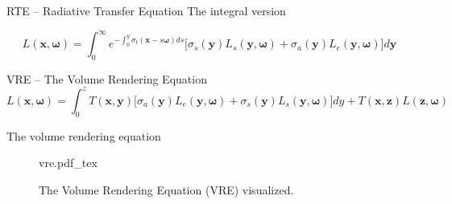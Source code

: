 \documentclass[
  english,            %
  aspectratio=169,    %
]{tumbeamer}
\newcommand\bx[0]{\textbf{x}}
\newcommand\by[0]{\textbf{y}}
\newcommand\bomega[0]{\boldsymbol{\omega}}
\newcommand{\incfig}[1]{%
    \def\svgwidth{\columnwidth}
    {#1.pdf_tex}
}
\begin{document}
\begin{frame}{RTE -- Radiative Transfer Equation}
    {The integral version}
    \vfill
    \begin{figure}[ht]
        \centering
        \scalebox{.7}{
            
        }
    \end{figure}
    \vfill
    \begin{equation}
        L(\bx, \bomega) = \int_0^\infty 
        e^{-\int_0^y{\sigma_t(\bx-s\bomega)}ds}
        \Big[
            \sigma_s(\by)L_s(\by, \bomega) + \sigma_a(\by)L_e(\by, \bomega)
        \Big]
        d\by
    \end{equation}
    \vfill
\end{frame}

\begin{frame}{VRE -- The Volume Rendering Equation}
    \begin{equation}
    L(\bx, \bomega) = \int_{0}^{z} 
        T(\bx, \by)
        \big[ 
            \sigma_a(\by)L_e(\by, \bomega) + 
            \sigma_s(\by)L_s(\by, \bomega)
        \big] dy
        + 
        T(\bx, \textbf{z})L(\textbf{z},\bomega)
    \end{equation}

\end{frame}

\begin{frame}{The volume rendering equation}
    \begin{figure}[ht]
        \centering
        \incfig{vre}
        \caption{The Volume Rendering Equation (VRE) visualized.}
        \label{fig:vre}
    \end{figure}
\end{frame}
\end{document}
